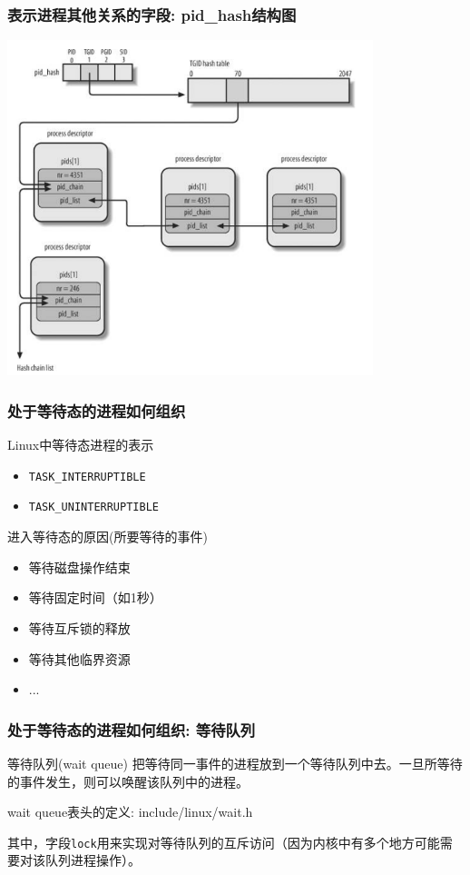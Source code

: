 \documentclass[xcolor=svgnames]{beamer}
\begin{document}
\begin{CJK*}{UTF8}{gbsn}
\begin{frame}[fragile]
\frametitle{表示进程其他关系的字段: pid\_hash结构图} 
\includegraphics[width=0.8\textwidth]{pidhashes.png}
\end{frame}

\begin{frame}[fragile]
\frametitle{处于等待态的进程如何组织}
\begin{block}{Linux中等待态进程的表示}
\begin{itemize}
\item \verb|TASK_INTERRUPTIBLE|
\item \verb|TASK_UNINTERRUPTIBLE|
\end{itemize}
\end{block}
\begin{block}{进入等待态的原因(所要等待的事件)}
\begin{itemize}
\item 等待磁盘操作结束
\item 等待固定时间（如1秒）
\item 等待互斥锁的释放
\item 等待其他临界资源
\item ...
\end{itemize}
\end{block}
\end{frame}

\begin{frame}[fragile]
\frametitle{处于等待态的进程如何组织: 等待队列}
\begin{block}{等待队列(wait queue)}
把等待同一事件的进程放到一个等待队列中去。一旦所等待的事件发生，则可以唤醒该队列中的进程。
\end{block}
\begin{block}{wait queue表头的定义: include/linux/wait.h}
\lstwaitqueuehead
\end{block}
其中，字段\verb|lock|用来实现对等待队列的互斥访问（因为内核中有多个地方可能需要对该队列进程操作）。
\end{frame}



\end{CJK*}
\end{document}
